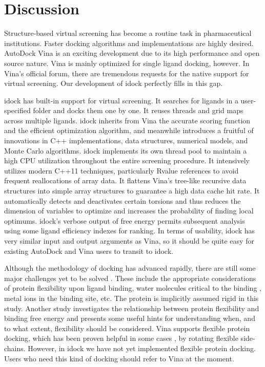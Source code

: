 \section{Discussion}

Structure-based virtual screening has become a routine task in pharmaceutical institutions. Faster docking algorithms and implementations are highly desired. AutoDock Vina \citep{595} is an exciting development due to its high performance and open source nature. Vina is mainly optimized for single ligand docking, however. In Vina's official forum, there are tremendous requests for the native support for virtual screening. Our development of idock perfectly fills in this gap.

idock has built-in support for virtual screening. It searches for ligands in a user-specified folder and docks them one by one. It reuses threads and grid maps across multiple ligands. idock inherits from Vina the accurate scoring function and the efficient optimization algorithm, and meanwhile introduces a fruitful of innovations in C++ implementations, data structures, numerical models, and Monte Carlo algorithms. idock implements its own thread pool to maintain a high CPU utilization throughout the entire screening procedure. It intensively utilizes modern C++11 techniques, particularly Rvalue references to avoid frequent reallocations of array data. It flattens Vina's tree-like recursive data structures into simple array structures to guarantee a high data cache hit rate. It automatically detects and deactivates certain torsions and thus reduces the dimension of variables to optimize and increases the probability of finding local optimums. idock's verbose output of free energy permits subsequent analysis using some ligand efficiency indexes \citep{337,336,335} for ranking. In terms of usability, idock has very similar input and output arguments as Vina, so it should be quite easy for existing AutoDock and Vina users to transit to idock.

Although the methodology of docking has advanced rapidly, there are still some major challenges yet to be solved \citep{493}. These include the appropriate considerations of protein flexibility upon ligand binding, water molecules critical to the binding \citep{1343,970,1489}, metal ions in the binding site, etc. The protein is implicitly assumed rigid in this study. Another study \citep{1397} investigates the relationship between protein flexibility and binding free energy and presents some useful hints for understanding when, and to what extent, flexibility should be considered. Vina supports flexible protein docking, which has been proven helpful in some cases \citep{1084}, by rotating flexible side-chains. However, in idock we have not yet implemented flexible protein docking. Users who need this kind of docking should refer to Vina at the moment.

